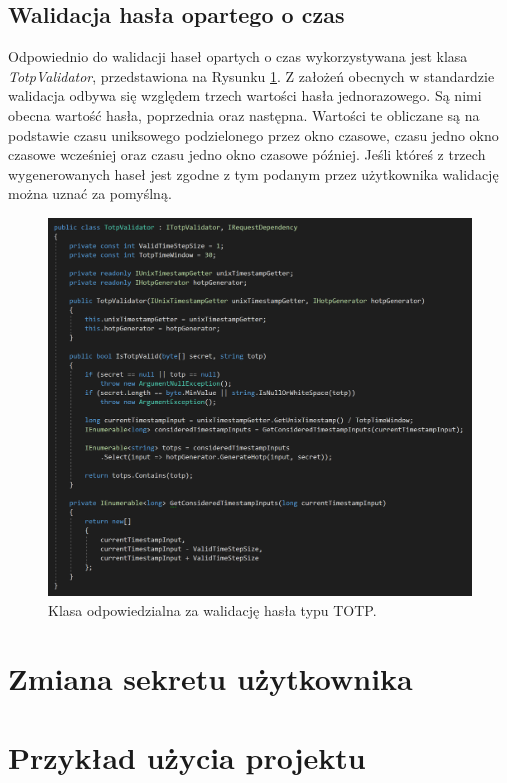 \subsection{Walidacja hasła opartego o czas}
Odpowiednio do walidacji haseł opartych o czas wykorzystywana jest klasa \textit{TotpValidator}, 
przedstawiona na Rysunku \ref{totp-validator}.
Z założeń obecnych w standardzie walidacja odbywa się względem trzech wartości hasła jednorazowego.
Są nimi obecna wartość hasła, poprzednia oraz następna. 
Wartości te obliczane są na podstawie czasu uniksowego podzielonego przez okno czasowe, 
czasu jedno okno czasowe wcześniej oraz czasu jedno okno czasowe później. 
Jeśli któreś z trzech wygenerowanych haseł jest zgodne z tym podanym przez użytkownika walidację można uznać za pomyślną.
\begin{figure}[t]
    \centering
	\includegraphics[width=\textwidth]{content/images/code-tvalidator}
    \caption{Klasa odpowiedzialna za walidację hasła typu TOTP.}
    \label{totp-validator}
\end{figure}

\section{Zmiana sekretu użytkownika}


\section{Przykład użycia projektu}

